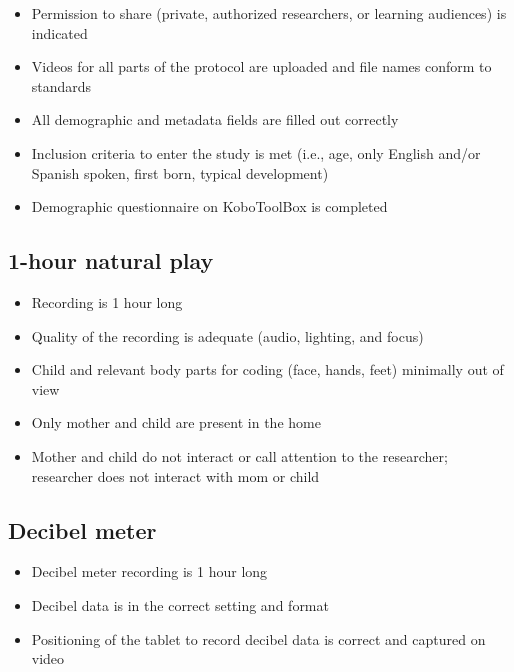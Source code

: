\documentclass[
]{book}
\providecommand{\tightlist}{%
  \setlength{\itemsep}{0pt}\setlength{\parskip}{0pt}}
\begin{document}
\begin{itemize}
\tightlist
\item
  Permission to share (private, authorized researchers, or learning audiences) is indicated
\item
  Videos for all parts of the protocol are uploaded and file names conform to standards
\item
  All demographic and metadata fields are filled out correctly
\item
  Inclusion criteria to enter the study is met (i.e., age, only English and/or Spanish spoken, first born, typical development)
\item
  Demographic questionnaire on KoboToolBox is completed
\end{itemize}

\hypertarget{hour-natural-play}{%
\subsection{1-hour natural play}\label{hour-natural-play}}

\begin{itemize}
\tightlist
\item
  Recording is 1 hour long
\item
  Quality of the recording is adequate (audio, lighting, and focus)
\item
  Child and relevant body parts for coding (face, hands, feet) minimally out of view
\item
  Only mother and child are present in the home
\item
  Mother and child do not interact or call attention to the researcher; researcher does not interact with mom or child
\end{itemize}

\hypertarget{decibel-meter-1}{%
\subsection{Decibel meter}\label{decibel-meter-1}}

\begin{itemize}
\tightlist
\item
  Decibel meter recording is 1 hour long
\item
  Decibel data is in the correct setting and format
\item
  Positioning of the tablet to record decibel data is correct and captured on video
\end{itemize}
\end{document}
